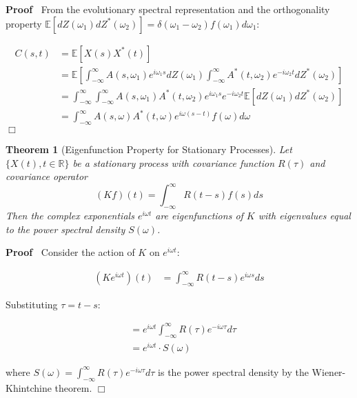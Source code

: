 \documentclass{article}
\newenvironment{proof}{\noindent\textbf{Proof\ }}{\hspace*{\fill}$\Box$\medskip}
\newtheorem{theorem}{Theorem}
\begin{document}
\begin{proof}
  From the evolutionary spectral representation and the orthogonality property
  $\mathbb{E} [dZ (\omega_1) dZ^{\ast} (\omega_2)] = \delta (\omega_1 -
  \omega_2) f (\omega_1) d \omega_1$:
  
  \begin{align}
    C (s, t) & =\mathbb{E} [X (s) X^{\ast} (t)] \\
    & =\mathbb{E} \left[ \int_{- \infty}^{\infty} A (s, \omega_1) e^{i
    \omega_1 s} dZ (\omega_1) \int_{- \infty}^{\infty} A^{\ast} (t, \omega_2)
    e^{- i \omega_2 t} dZ^{\ast} (\omega_2) \right] \\
    & = \int_{- \infty}^{\infty} \int_{- \infty}^{\infty} A (s, \omega_1)
    A^{\ast} (t, \omega_2) e^{i \omega_1 s} e^{- i \omega_2 t} \mathbb{E} [dZ
    (\omega_1) dZ^{\ast} (\omega_2)] \\
    & = \int_{- \infty}^{\infty} A (s, \omega) A^{\ast} (t, \omega) e^{i
    \omega (s - t)} f (\omega) d \omega 
  \end{align}
\end{proof}

\begin{theorem}
  [Eigenfunction Property for Stationary Processes] Let $\{X (t), t \in
  \mathbb{R}\}$ be a stationary process with covariance function $R (\tau)$
  and covariance operator
  \begin{equation}
    (Kf) (t) = \int_{- \infty}^{\infty} R (t - s) f (s) ds
  \end{equation}
  Then the complex exponentials $e^{i \omega t}$ are eigenfunctions of $K$
  with eigenvalues equal to the power spectral density $S (\omega)$.
\end{theorem}

\begin{proof}
  Consider the action of $K$ on $e^{i \omega t}$:
  
  \begin{align}
    (Ke^{i \omega t}) (t) & = \int_{- \infty}^{\infty} R (t - s) e^{i \omega
    s} ds 
  \end{align}
  
  Substituting $\tau = t - s$:
  
  \begin{align}
    & = e^{i \omega t}  \int_{- \infty}^{\infty} R (\tau) e^{- i \omega \tau}
    d \tau \\
    & = e^{i \omega t} \cdot S (\omega) 
  \end{align}
  
  where $S (\omega) = \int_{- \infty}^{\infty} R (\tau) e^{- i \omega \tau} d
  \tau$ is the power spectral density by the Wiener-Khintchine theorem.
\end{proof}
\end{document}
